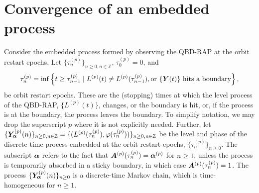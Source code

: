 
\section{Convergence of an embedded process}\label{sec: embedded}


Consider the embedded process formed by observing the QBD-RAP at the orbit restart epochs. Let \(\{\tau_n^{(p)}\}_{n\geq 0, n \in \mathbb Z}\), \(\tau_0^{(p)}=0\), and
\[\tau_{n}^{(p)} = \inf\left\{t\geq \tau_{n-1}^{(p)} \mid L^{(p)}(t)\neq L^{(p)}(\tau_{n-1}^{(p)}), \mbox{or \(\{\boldsymbol Y(t)\}\) hits a boundary}\right\},\]
be orbit restart epochs. These are the (stopping) times at which the level process of the QBD-RAP, \(\{L^{(p)}(t)\}\), changes, or the boundary is hit, or, if the process is at the boundary, the process leaves the boundary. To simplify notation, we may drop the superscript \(p\) where it is not explicitly needed. Further, let \(\{\bm{Y}_{\bm{\alpha}}^{(p)}(n)\}_{n\geq 0, n \in \mathbb Z} = \{(L^{(p)}(\tau_n^{(p)}),\varphi(\tau_n^{(p)}))\}_{n\geq 0, n \in \mathbb Z}\) be the level and phase of the discrete-time process embedded at the orbit restart epochs, \(\{\tau_n^{(p)}\}_{n\geq 0}\). The subscript \(\boldsymbol \alpha \) refers to the fact that \(\boldsymbol A^{(p)}(\tau_n^{(p)})=\boldsymbol \alpha^{(p)}\) for \(n\geq 1\), unless the process is temporarily absorbed in a sticky boundary, in which case \(\boldsymbol A^{(p)}(\tau_n^{(p)})=1\). The process \(\{\bm{Y}_{\bm{\alpha}}^{(p)}(n)\}_{n\geq 0}\) is a discrete-time Markov chain, which is time-homogeneous for \(n\geq 1\). 

